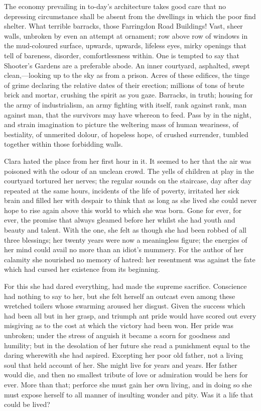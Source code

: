 The economy prevailing in to-day's architecture takes good care that no
depressing circumstance shall be absent from the dwellings in which the
poor find shelter. What terrible barracks, those Farringdon Road
Buildings! Vast, sheer walls, unbroken by even an attempt at ornament;
row above row of windows in the mud-coloured surface, upwards, upwards,
lifeless eyes, mirky openings that tell of bareness, disorder,
comfortlessness within. One is tempted to say that Shooter's Gardens are
a preferable abode. An inner courtyard, asphalted, swept
clean,---looking up to the sky as from a prison. Acres of these
edifices, the tinge of grime declaring the relative dates of their
erection; millions of tons of brute brick and mortar, crushing the
spirit as you gaze. Barracks, in truth; housing for the army of
industrialism, an army fighting with itself, rank against rank, man
against man, that the survivors may have
{\protect\hypertarget{59}{}{}}whereon to feed. Pass by in the night, and
strain imagination to picture the weltering mass of human weariness, of
bestiality, of unmerited dolour, of hopeless hope, of crushed surrender,
tumbled together within those forbidding walls.

Clara hated the place from her first hour in it. It seemed to her that
the air was poisoned with the odour of an unclean crowd. The yells of
children at play in the courtyard tortured her nerves; the regular
sounds on the staircase, day after day repeated at the same hours,
incidents of the life of poverty, irritated her sick brain and filled
her with despair to think that as long as she lived she could never hope
to rise again above this world to which she was born. Gone for ever, for
ever, the promise that always gleamed before her whilst she had youth
and beauty and talent. With the one, she felt as though she had been
robbed of all three blessings; her twenty years were now a meaningless
figure; the energies of her mind could avail no more than an idiot's
mummery. For the author of her calamity she nourished no memory of
hatred: her resentment was {\protect\hypertarget{60}{}{}}against the
fate which had cursed her existence from its beginning.

For this she had dared everything, had made the supreme sacrifice.
Conscience had nothing to say to her, but she felt herself an outcast
even among these wretched toilers whose swarming aroused her disgust.
Given the success which had been all but in her grasp, and triumph ant
pride would have scored out every misgiving as to the cost at which the
victory had been won. Her pride was unbroken; under the stress of
anguish it became a scorn for goodness and humility; but in the
desolation of her future she read a punishment equal to the daring
wherewith she had aspired. Excepting her poor old father, not a living
soul that held account of her. She might live for years and years. Her
father would die, and then no smallest tribute of love or admiration
would be hers for ever. More than that; perforce she must gain her own
living, and in doing so she must expose herself to all manner of
insulting wonder and pity. Was it a life that could be lived?

